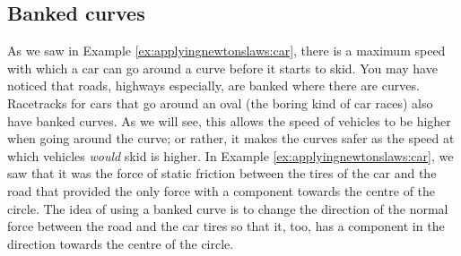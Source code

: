 \subsection{Banked curves}
As we saw in Example \ref{ex:applyingnewtonslaws:car}, there is a maximum speed with which a car can go around a curve before it starts to skid. You may have noticed that roads, highways especially, are banked where there are curves. Racetracks for cars that go around an oval (the boring kind of car races) also have banked curves. As we will see, this allows the speed of vehicles to be higher when going around the curve; or rather, it makes the curves safer as the speed at which vehicles \textit{would} skid is higher. In Example \ref{ex:applyingnewtonslaws:car}, we saw that it was the force of static friction between the tires of the car and the road that provided the only force with a component towards the centre of the circle. The idea of using a banked curve is to change the direction of the normal force between the road and the car tires so that it, too, has a component in the direction towards the centre of the circle. 

